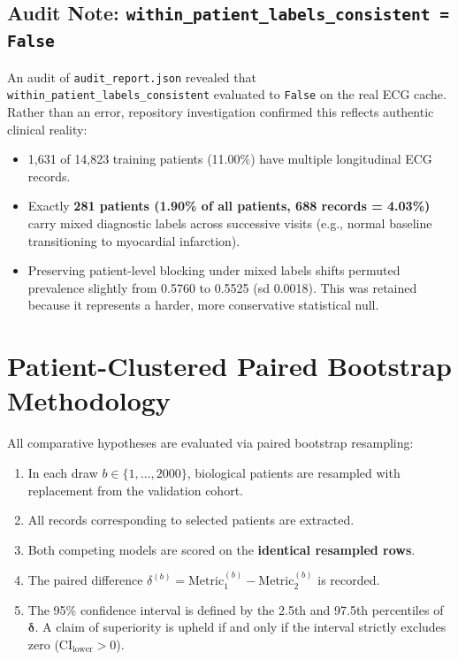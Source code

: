 \documentclass[11pt,a4paper]{report}
\newcommand{\artifact}[1]{\texttt{\footnotesize #1}}
\begin{document}
\subsection{Audit Note: \texttt{within\_patient\_labels\_consistent = False}}
An audit of \artifact{audit\_report.json} revealed that \texttt{within\_patient\_labels\_consistent} evaluated to \texttt{False} on the real ECG cache. Rather than an error, repository investigation confirmed this reflects authentic clinical reality:
\begin{itemize}
  \item 1,631 of 14,823 training patients (11.00\%) have multiple longitudinal ECG records.
  \item Exactly \textbf{281 patients (1.90\% of all patients, 688 records = 4.03\%)} carry mixed diagnostic labels across successive visits (e.g., normal baseline transitioning to myocardial infarction).
  \item Preserving patient-level blocking under mixed labels shifts permuted prevalence slightly from 0.5760 to 0.5525 (sd 0.0018). This was retained because it represents a harder, more conservative statistical null.
\end{itemize}

\section{Patient-Clustered Paired Bootstrap Methodology}
All comparative hypotheses are evaluated via paired bootstrap resampling:
\begin{enumerate}
  \item In each draw $b \in \{1, \dots, 2000\}$, biological patients are resampled with replacement from the validation cohort.
  \item All records corresponding to selected patients are extracted.
  \item Both competing models are scored on the \textbf{identical resampled rows}.
  \item The paired difference $\delta^{(b)} = \text{Metric}_1^{(b)} - \text{Metric}_2^{(b)}$ is recorded.
  \item The 95\% confidence interval is defined by the 2.5th and 97.5th percentiles of $\boldsymbol{\delta}$. A claim of superiority is upheld if and only if the interval strictly excludes zero ($\text{CI}_\text{lower} > 0$).
\end{enumerate}

\end{document}
